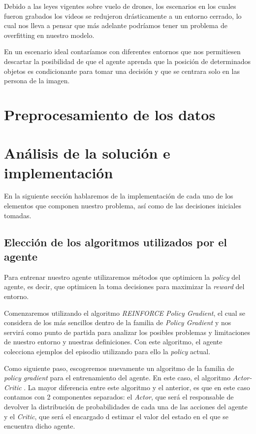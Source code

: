 Debido a las leyes vigentes sobre vuelo de drones, los escenarios en los cuales fueron grabados los videos se redujeron drásticamente a un entorno cerrado, lo cual nos lleva a pensar que más adelante podríamos tener un problema de overfitting en nuestro modelo.
\medskip

En un escenario ideal contaríamos con diferentes entornos que nos permitiesen descartar la posibilidad de que el agente aprenda que la posición de determinados objetos es condicionante para tomar una decisión y que se centrara solo en las persona de la imagen.
\medskip

\section{Preprocesamiento de los datos}
\label{preprocesamiento-datos}


\section{Análisis de la solución e implementación}
\label{analisis-de-la-solucion-e-implementacion}

En la siguiente sección hablaremos de la implementación de cada uno de los elementos que componen nuestro problema, así como de las decisiones iniciales tomadas.
\subsection{Elección de los algoritmos utilizados por el agente}
\label{eleccion-de-algoritmos}

Para entrenar nuestro agente utilizaremos métodos que optimicen la \textit{policy} del agente, es decir, que optimicen la toma decisiones para maximizar la \textit{reward} del entorno.
\medskip

Comenzaremos utilizando el algoritmo \textit{REINFORCE Policy Gradient}, el cual se considera de los más sencillos dentro de la familia de \textit{Policy Gradient} y nos servirá como punto de partida para analizar los posibles problemas y limitaciones de nuestro entorno y nuestras definiciones. Con este algoritmo, el agente colecciona ejemplos del episodio utilizando para ello la \textit{policy} actual.
\medskip



Como siguiente paso, escogeremos nuevamente un algoritmo de la familia de \textit{policy gradient} para el entrenamiento del agente. En este caso, el algoritmo \textit{Actor-Critic} \citep{DBLP:journals/corr/abs-1801-01290}. La mayor diferencia entre este algoritmo y el anterior, es que en este caso contamos con 2 componentes separados: el \textit{Actor}, que será el responsable de devolver la distribución de probabilidades de cada una de las acciones del agente y el \textit{Critic}, que será el encargado d estimar el valor del estado en el que se encuentra dicho agente.
\medskip

